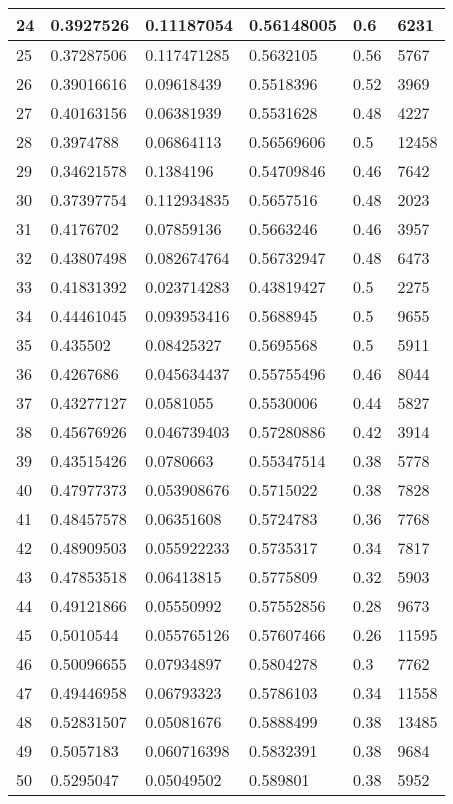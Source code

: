 \begin{longtable}{|l|l|l|l|l|l|}
24 & 0.3927526 & 0.11187054 & 0.56148005 & 0.6 & 6231 \\ \hline 
25 & 0.37287506 & 0.117471285 & 0.5632105 & 0.56 & 5767 \\ \hline 
26 & 0.39016616 & 0.09618439 & 0.5518396 & 0.52 & 3969 \\ \hline 
27 & 0.40163156 & 0.06381939 & 0.5531628 & 0.48 & 4227 \\ \hline 
28 & 0.3974788 & 0.06864113 & 0.56569606 & 0.5 & 12458 \\ \hline 
29 & 0.34621578 & 0.1384196 & 0.54709846 & 0.46 & 7642 \\ \hline 
30 & 0.37397754 & 0.112934835 & 0.5657516 & 0.48 & 2023 \\ \hline 
31 & 0.4176702 & 0.07859136 & 0.5663246 & 0.46 & 3957 \\ \hline 
32 & 0.43807498 & 0.082674764 & 0.56732947 & 0.48 & 6473 \\ \hline 
33 & 0.41831392 & 0.023714283 & 0.43819427 & 0.5 & 2275 \\ \hline 
34 & 0.44461045 & 0.093953416 & 0.5688945 & 0.5 & 9655 \\ \hline 
35 & 0.435502 & 0.08425327 & 0.5695568 & 0.5 & 5911 \\ \hline 
36 & 0.4267686 & 0.045634437 & 0.55755496 & 0.46 & 8044 \\ \hline 
37 & 0.43277127 & 0.0581055 & 0.5530006 & 0.44 & 5827 \\ \hline 
38 & 0.45676926 & 0.046739403 & 0.57280886 & 0.42 & 3914 \\ \hline 
39 & 0.43515426 & 0.0780663 & 0.55347514 & 0.38 & 5778 \\ \hline 
40 & 0.47977373 & 0.053908676 & 0.5715022 & 0.38 & 7828 \\ \hline 
41 & 0.48457578 & 0.06351608 & 0.5724783 & 0.36 & 7768 \\ \hline 
42 & 0.48909503 & 0.055922233 & 0.5735317 & 0.34 & 7817 \\ \hline 
43 & 0.47853518 & 0.06413815 & 0.5775809 & 0.32 & 5903 \\ \hline 
44 & 0.49121866 & 0.05550992 & 0.57552856 & 0.28 & 9673 \\ \hline 
45 & 0.5010544 & 0.055765126 & 0.57607466 & 0.26 & 11595 \\ \hline 
46 & 0.50096655 & 0.07934897 & 0.5804278 & 0.3 & 7762 \\ \hline 
47 & 0.49446958 & 0.06793323 & 0.5786103 & 0.34 & 11558 \\ \hline 
48 & 0.52831507 & 0.05081676 & 0.5888499 & 0.38 & 13485 \\ \hline 
49 & 0.5057183 & 0.060716398 & 0.5832391 & 0.38 & 9684 \\ \hline 
50 & 0.5295047 & 0.05049502 & 0.589801 & 0.38 & 5952 \\ \hline 
\end{longtable}